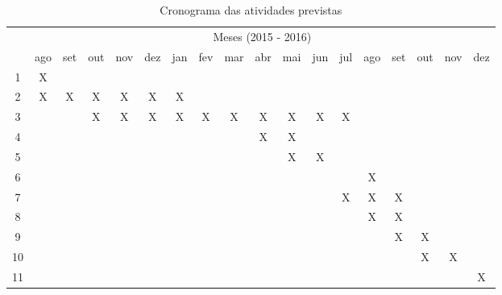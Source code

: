 \begin{table}[!htpb]
  \centering
  \begin{small}
    \setlength{\tabcolsep}{4pt}
    \begin{tabular}{|c|c|c|c|c|c|c|c|c|c|c|c|c|c|c|c|c|c|}\hline
     & \multicolumn{17}{c|}{Meses (2015 - 2016)}\\ \cline{2-18}
    \raisebox{1.5ex}{Etapa} & ago & set & out & nov & dez & jan & fev & mar & abr & mai & jun & jul & ago & set & out & nov & dez \\ \hline
    1 & X &   &   &   &   &   &   &   &   &   &   &   &   &   &   &   & \\ \hline
    2 & X & X & X & X & X & X &   &   &   &   &   &   &   &   &   &   & \\ \hline
    3 &   &   & X & X & X & X & X & X & X & X & X & X &   &   &   &   & \\ \hline
    4 &   &   &   &   &   &   &   &   & X & X &   &   &   &   &   &   & \\ \hline
    5 &   &   &   &   &   &   &   &   &   & X & X &   &   &   &   &   & \\ \hline
    6 &   &   &   &   &   &   &   &   &   &   &   &   & X &   &   &   & \\ \hline
    7 &   &   &   &   &   &   &   &   &   &   &   & X & X & X &   &   & \\ \hline
    8 &   &   &   &   &   &   &   &   &   &   &   &   & X & X &   &   & \\ \hline
    9 &   &   &   &   &   &   &   &   &   &   &   &   &   & X & X &   & \\ \hline
    10 &  &   &   &   &   &   &   &   &   &   &   &   &   &   & X & X & \\ \hline
    11 &  &   &   &   &   &   &   &   &   &   &   &   &   &   &   &   & X \\ \hline
    \end{tabular}
  \end{small}
  \caption{Cronograma das atividades previstas}
  \label{t_cronograma}
\end{table}

